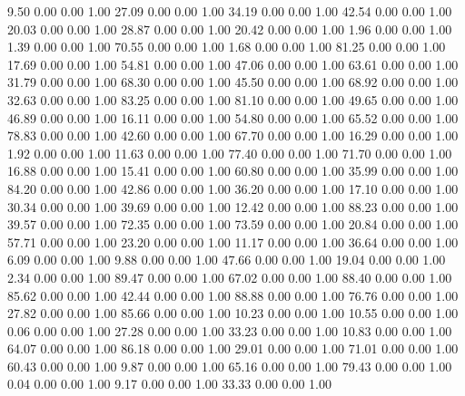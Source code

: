     9.50   0.00   0.00   1.00
   27.09   0.00   0.00   1.00
   34.19   0.00   0.00   1.00
   42.54   0.00   0.00   1.00
   20.03   0.00   0.00   1.00
   28.87   0.00   0.00   1.00
   20.42   0.00   0.00   1.00
    1.96   0.00   0.00   1.00
    1.39   0.00   0.00   1.00
   70.55   0.00   0.00   1.00
    1.68   0.00   0.00   1.00
   81.25   0.00   0.00   1.00
   17.69   0.00   0.00   1.00
   54.81   0.00   0.00   1.00
   47.06   0.00   0.00   1.00
   63.61   0.00   0.00   1.00
   31.79   0.00   0.00   1.00
   68.30   0.00   0.00   1.00
   45.50   0.00   0.00   1.00
   68.92   0.00   0.00   1.00
   32.63   0.00   0.00   1.00
   83.25   0.00   0.00   1.00
   81.10   0.00   0.00   1.00
   49.65   0.00   0.00   1.00
   46.89   0.00   0.00   1.00
   16.11   0.00   0.00   1.00
   54.80   0.00   0.00   1.00
   65.52   0.00   0.00   1.00
   78.83   0.00   0.00   1.00
   42.60   0.00   0.00   1.00
   67.70   0.00   0.00   1.00
   16.29   0.00   0.00   1.00
    1.92   0.00   0.00   1.00
   11.63   0.00   0.00   1.00
   77.40   0.00   0.00   1.00
   71.70   0.00   0.00   1.00
   16.88   0.00   0.00   1.00
   15.41   0.00   0.00   1.00
   60.80   0.00   0.00   1.00
   35.99   0.00   0.00   1.00
   84.20   0.00   0.00   1.00
   42.86   0.00   0.00   1.00
   36.20   0.00   0.00   1.00
   17.10   0.00   0.00   1.00
   30.34   0.00   0.00   1.00
   39.69   0.00   0.00   1.00
   12.42   0.00   0.00   1.00
   88.23   0.00   0.00   1.00
   39.57   0.00   0.00   1.00
   72.35   0.00   0.00   1.00
   73.59   0.00   0.00   1.00
   20.84   0.00   0.00   1.00
   57.71   0.00   0.00   1.00
   23.20   0.00   0.00   1.00
   11.17   0.00   0.00   1.00
   36.64   0.00   0.00   1.00
    6.09   0.00   0.00   1.00
    9.88   0.00   0.00   1.00
   47.66   0.00   0.00   1.00
   19.04   0.00   0.00   1.00
    2.34   0.00   0.00   1.00
   89.47   0.00   0.00   1.00
   67.02   0.00   0.00   1.00
   88.40   0.00   0.00   1.00
   85.62   0.00   0.00   1.00
   42.44   0.00   0.00   1.00
   88.88   0.00   0.00   1.00
   76.76   0.00   0.00   1.00
   27.82   0.00   0.00   1.00
   85.66   0.00   0.00   1.00
   10.23   0.00   0.00   1.00
   10.55   0.00   0.00   1.00
    0.06   0.00   0.00   1.00
   27.28   0.00   0.00   1.00
   33.23   0.00   0.00   1.00
   10.83   0.00   0.00   1.00
   64.07   0.00   0.00   1.00
   86.18   0.00   0.00   1.00
   29.01   0.00   0.00   1.00
   71.01   0.00   0.00   1.00
   60.43   0.00   0.00   1.00
    9.87   0.00   0.00   1.00
   65.16   0.00   0.00   1.00
   79.43   0.00   0.00   1.00
    0.04   0.00   0.00   1.00
    9.17   0.00   0.00   1.00
   33.33   0.00   0.00   1.00
